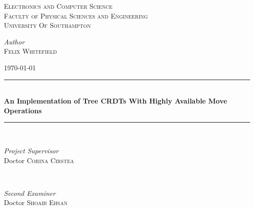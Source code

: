 \documentclass[12pt]{report}
\begin{document}
 

\setcounter{page}{1}

\begin{titlepage} %
    \newcommand{\HRule}{\rule{\linewidth}{0.5mm}} %

    \center %


    \textsc{\Large Electronics and Computer Science}\\[0.5cm] %

    \textsc{\large Faculty of Physical Sciences and Engineering}\\[0.5cm] %

    \textsc{\LARGE University Of Southampton}\\[1.5cm] %

    \begin{center}
        \large
        \textit{Author}\\
        \textsc{Felix Whitefield} %
    \end{center}
    {\large \today} %

    \vfill


    \HRule\\[0.4cm]

    {\huge\bfseries An Implementation of Tree CRDTs With Highly Available Move Operations}\\[0.4cm] %

    \HRule\\[1cm]



    \vfill

    \begin{minipage}{0.45\textwidth}
        \begin{flushleft}
            \large
            \textit{Project Supervisor}\\
            Doctor \textsc{Corina Cirstea} %
        \end{flushleft}
    \end{minipage}
    ~
    \begin{minipage}{0.45\textwidth}
        \begin{flushright}
            \large
            \textit{Second Examiner}\\
            Doctor \textsc{Shoaib Ehsan} %
        \end{flushright}
    \end{minipage}


\end{titlepage}
\end{document}
